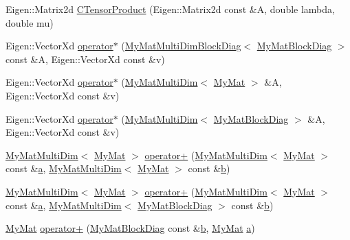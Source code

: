 \begin{DoxyCompactItemize}
Eigen\-::\-Matrix2d \hyperlink{namespaceTspeed_a9d11c91c5dfc1a66b18914535aaf57b3}{C\-Tensor\-Product} (Eigen\-::\-Matrix2d const \&A, double lambda, double mu)
\item 
Eigen\-::\-Vector\-Xd \hyperlink{namespaceTspeed_a50c55e28e30f425387c5cd23c59fbcbc}{operator$\ast$} (\hyperlink{classTspeed_1_1MyMatMultiDimBlockDiag}{My\-Mat\-Multi\-Dim\-Block\-Diag}$<$ \hyperlink{classTspeed_1_1MyMatBlockDiag}{My\-Mat\-Block\-Diag} $>$ const \&A, Eigen\-::\-Vector\-Xd const \&v)
\item 
Eigen\-::\-Vector\-Xd \hyperlink{namespaceTspeed_a9c66d3a5dfbcc24d4a5a60af27d25e79}{operator$\ast$} (\hyperlink{classTspeed_1_1MyMatMultiDim}{My\-Mat\-Multi\-Dim}$<$ \hyperlink{classTspeed_1_1MyMat}{My\-Mat} $>$ \&A, Eigen\-::\-Vector\-Xd const \&v)
\item 
Eigen\-::\-Vector\-Xd \hyperlink{namespaceTspeed_aa1cf50773f63e4c0cde90696c38e8a70}{operator$\ast$} (\hyperlink{classTspeed_1_1MyMatMultiDim}{My\-Mat\-Multi\-Dim}$<$ \hyperlink{classTspeed_1_1MyMatBlockDiag}{My\-Mat\-Block\-Diag} $>$ \&A, Eigen\-::\-Vector\-Xd const \&v)
\item 
\hyperlink{classTspeed_1_1MyMatMultiDim}{My\-Mat\-Multi\-Dim}$<$ \hyperlink{classTspeed_1_1MyMat}{My\-Mat} $>$ \hyperlink{namespaceTspeed_aba1b7bce0d7c55cda2d7452fe2675879}{operator+} (\hyperlink{classTspeed_1_1MyMatMultiDim}{My\-Mat\-Multi\-Dim}$<$ \hyperlink{classTspeed_1_1MyMat}{My\-Mat} $>$ const \&\hyperlink{load__and__plot__lamb_8m_aa875ab3a8009406dcace7fa71a0f490d}{a}, \hyperlink{classTspeed_1_1MyMatMultiDim}{My\-Mat\-Multi\-Dim}$<$ \hyperlink{classTspeed_1_1MyMat}{My\-Mat} $>$ const \&\hyperlink{load__and__plot__lamb_8m_a21c7e548e910bb7ce7dcea81de72c8f7}{b})
\item 
\hyperlink{classTspeed_1_1MyMatMultiDim}{My\-Mat\-Multi\-Dim}$<$ \hyperlink{classTspeed_1_1MyMat}{My\-Mat} $>$ \hyperlink{namespaceTspeed_aa89f27c4c9e53c2e7ec8e25f2e1451de}{operator+} (\hyperlink{classTspeed_1_1MyMatMultiDim}{My\-Mat\-Multi\-Dim}$<$ \hyperlink{classTspeed_1_1MyMat}{My\-Mat} $>$ const \&\hyperlink{load__and__plot__lamb_8m_aa875ab3a8009406dcace7fa71a0f490d}{a}, \hyperlink{classTspeed_1_1MyMatMultiDim}{My\-Mat\-Multi\-Dim}$<$ \hyperlink{classTspeed_1_1MyMatBlockDiag}{My\-Mat\-Block\-Diag} $>$ const \&\hyperlink{load__and__plot__lamb_8m_a21c7e548e910bb7ce7dcea81de72c8f7}{b})
\item 
\hyperlink{classTspeed_1_1MyMat}{My\-Mat} \hyperlink{namespaceTspeed_a5c1d03d05f350c1ae6239e07f80b6eb8}{operator+} (\hyperlink{classTspeed_1_1MyMatBlockDiag}{My\-Mat\-Block\-Diag} const \&\hyperlink{load__and__plot__lamb_8m_a21c7e548e910bb7ce7dcea81de72c8f7}{b}, \hyperlink{classTspeed_1_1MyMat}{My\-Mat} \hyperlink{load__and__plot__lamb_8m_aa875ab3a8009406dcace7fa71a0f490d}{a})
\end{DoxyCompactItemize}



